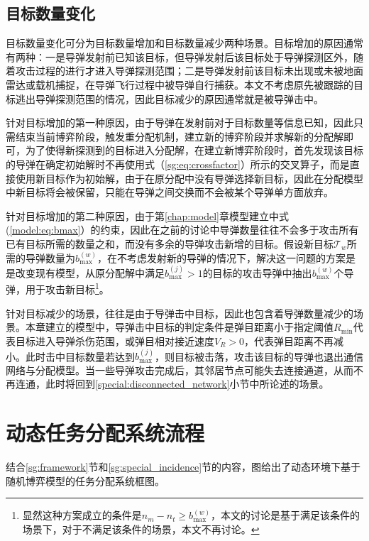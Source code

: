 \subsection{目标数量变化}
\label{special:target_num_change}

目标数量变化可分为目标数量增加和目标数量减少两种场景。目标增加的原因通常有两种：一是导弹发射前已知该目标，但导弹发射后该目标处于导弹探测区外，随着攻击过程的进行才进入导弹探测范围；二是导弹发射前该目标未出现或未被地面雷达或载机捕捉，在导弹飞行过程中被导弹自行捕获。本文不考虑原先被跟踪的目标逃出导弹探测范围的情况，因此目标减少的原因通常就是被导弹击中。

针对目标增加的第一种原因，由于导弹在发射前对于目标数量等信息已知，因此只需结束当前博弈阶段，触发重分配机制，建立新的博弈阶段并求解新的分配解即可，为了使得新探测到的目标进入分配解，在建立新博弈阶段时，首先发现该目标的导弹在确定初始解时不再使用式（\ref{sg:eq:crossfactor}）所示的交叉算子，而是直接使用新目标作为初始解，由于在原分配中没有导弹选择新目标，因此在分配模型中新目标将会被保留，只能在导弹之间交换而不会被某个导弹单方面放弃。

针对目标增加的第二种原因，由于第\ref{chap:model}章模型建立中式(\ref{model:eq:bmax}）的约束，因此在之前的讨论中导弹数量往往不会多于攻击所有已有目标所需的数量之和，而没有多余的导弹攻击新增的目标。假设新目标$\mathcal{T}_w$所需的导弹数量为$b_{\text{max}}^{(w)}$，在不考虑发射新的导弹的情况下，解决这一问题的方案是是改变现有模型，从原分配解中满足$b_{\text{max}}^{(j)}>1$的目标的攻击导弹中抽出$b_{\text{max}}^{(w)}$个导弹，用于攻击新目标\footnote{显然这种方案成立的条件是$n_m-n_t \geq b_{\text{max}}^{(w)}$，本文的讨论是基于满足该条件的场景下，对于不满足该条件的场景，本文不再讨论。}。

针对目标减少的场景，往往是由于导弹击中目标，因此也包含着导弹数量减少的场景。本章建立的模型中，导弹击中目标的判定条件是弹目距离小于指定阈值$R_{\text{min}}$代表目标进入导弹杀伤范围，或弹目相对接近速度$V_R>0$，代表弹目距离不再减小。此时击中目标数量若达到$b_{\text{max}}^{(j)}$，则目标被击落，攻击该目标的导弹也退出通信网络与分配模型。当一些导弹攻击完成后，其邻居节点可能失去连接通道，从而不再连通，此时将回到\ref{special:disconnected_network}小节中所论述的场景。

\section{动态任务分配系统流程}

结合\ref{sg:framework}节和\ref{sg:special_incidence}节的内容，图给出了动态环境下基于随机博弈模型的任务分配系统框图。

